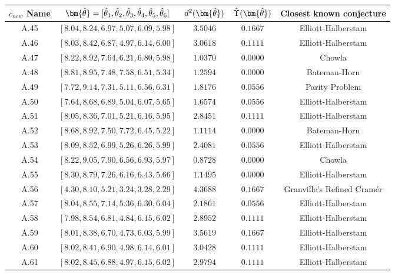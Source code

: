 \documentclass[11pt,reqno]{amsart}
\theoremstyle{plain}\newtheorem{theorem}{Theorem}[section]
\numberwithin{equation}{section}
\begin{document}
\begin{table}[ht]
\begin{center}
\begin{tabular}{|c|c|c|c|c|}
\hline
$c_{new}$ Name & ${\bm{\Hat{\theta}}}=[{\Hat{\theta}}_1,{\Hat{\theta}}_2,{\Hat{\theta}}_3,{\Hat{\theta}}_4,{\Hat{\theta}}_5,{\Hat{\theta}}_6]$ & $d^2(\bm{\Hat{\theta}})$ & $\Hat{\Upsilon}({\bm{\Hat{\theta}}})$ & Closest known conjecture \\
\hline
A.45  & $[8.04, 8.24, 6.97, 5.07, 6.09, 5.98]$ & $3.5046$ & $0.1667$ & Elliott-Halberstam  \\
A.46 & $[8.03, 8.42, 6.87, 4.97, 6.14, 6.00]$ & $3.0618$ & $0.1111$ & Elliott-Halberstam \\
A.47  & $[8.22, 8.92, 7.64, 6.21, 6.80, 5.98]$ & $1.0370$ & $0.0000$ & Chowla\\
A.48  & $[8.81, 8.95, 7.48, 7.58, 6.51, 5.34]$ & $1.2594$ & $0.0000$ & Bateman-Horn \\
A.49 & $[7.72, 9.14, 7.31, 5.11, 6.56, 6.31]$ & $1.8176$ & $0.0556$ & Parity Problem \\
A.50  & $[7.64, 8.68, 6.89, 5.04, 6.07, 5.65]$ & $1.6574$ & $0.0556$ & Elliott-Halberstam  \\
A.51  & $[8.05, 8.36, 7.01, 5.21, 6.16, 5.95]$ & $2.8451$ & $0.1111$ & Elliott-Halberstam \\
A.52  & $[8.68, 8.92, 7.50, 7.72, 6.45, 5.22]$ & $1.1114$ & $0.0000$ & Bateman-Horn  \\
A.53 & $[8.09, 8.52, 6.99, 5.26, 6.26, 5.99]$ & $2.4081$ & $0.0556$ & Elliott-Halberstam \\
A.54 & $[8.22, 9.05, 7.90, 6.56, 6.93, 5.97]$ & $0.8728$ & $0.0000$ & Chowla \\
A.55  & $[8.30, 8.79, 7.26, 6.16, 6.43, 5.66]$ & $1.1495$ & $0.0000$ & Elliott-Halberstam \\
A.56  & $[4.30, 8.10, 5.21, 3.24, 3.28, 2.29]$ & $4.3688$ & $0.1667$ & Granville's Refined Cram\'{e}r \\
A.57  & $[8.04, 8.55, 7.14, 5.36, 6.30, 6.04]$ & $2.1861$ & $0.0556$ & Elliott-Halberstam \\
A.58  & $[7.98, 8.54, 6.81, 4.84, 6.15, 6.02]$ & $2.8952$ & $0.1111$ & Elliott-Halberstam \\
A.59 & $[8.01, 8.38, 6.70, 4.73, 6.03, 5.99]$ & $3.5619$ & $0.1667$ & Elliott-Halberstam \\
A.60  & $[8.02, 8.41, 6.90, 4.98, 6.14, 6.01]$ & $3.0428$ & $0.1111$ & Elliott-Halberstam  \\
A.61 & $[8.02, 8.45, 6.88, 4.97, 6.15, 6.02]$ & $2.9794$ & $0.1111$ & Elliott-Halberstam  \\

\end{tabular}
\end{center}
\end{table}
\end{document}

